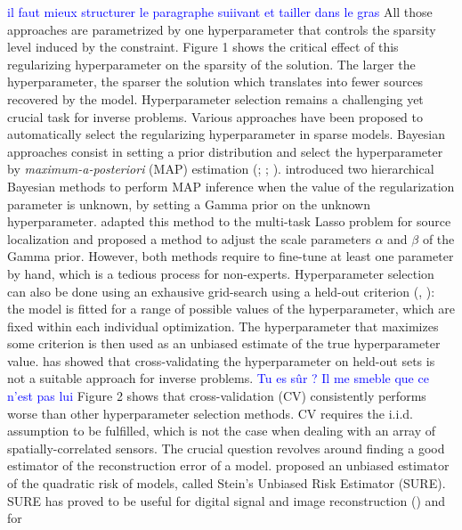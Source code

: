 \textcolor{blue}{il faut mieux structurer le paragraphe suiivant et tailler dans le gras}
All those approaches are parametrized by one hyperparameter that controls the sparsity level
induced by the constraint. Figure 1 shows the critical effect of this regularizing hyperparameter
on the sparsity of the solution. The larger the hyperparameter, the sparser the solution which translates
into fewer sources recovered by the model. Hyperparameter selection remains a challenging yet crucial task
for inverse problems. Various approaches have been proposed to automatically select the regularizing
hyperparameter in sparse models. Bayesian approaches consist in setting a prior distribution
and select the hyperparameter by \textit{maximum-a-posteriori} (MAP) estimation (\cite{Pereyra_BioucasDias_Figueiredo_2015};
\cite{Vidal_Bortoli_Pereyra_Durmus_2020}; \cite{Hashemi_Cai_Kutyniok_Muller_2020}).
\cite{Pereyra_BioucasDias_Figueiredo_2015} introduced two hierarchical Bayesian methods to perform MAP
inference when the value of the regularization parameter is unknown, by setting a Gamma prior on the
unknown hyperparameter. \cite{Bekhti_Badeau_Gramfort_2017} adapted this method to the multi-task Lasso problem
for source localization and proposed a method to adjust the scale parameters $\alpha$ and $\beta$
of the Gamma prior. However, both methods require to fine-tune at least one parameter by hand, which is a
tedious process for non-experts. Hyperparameter selection can also be done using an exhausive
grid-search using a held-out criterion (\cite{Bergstra_Bengio12}, \cite{BergstraBardenetBengioKegl2011}):
the model is fitted for a range of possible values of the hyperparameter, which are fixed within each individual optimization.
The hyperparameter that maximizes some criterion is then used as an unbiased estimate of the true hyperparameter value.
\cite{Pedregosa16} has showed that cross-validating the hyperparameter on held-out sets is not a suitable approach for inverse
problems.
\textcolor{blue}{Tu es sûr ? Il me smeble que ce n'est pas lui}
Figure 2 shows that cross-validation (CV) consistently performs worse than other
hyperparameter selection methods. CV requires the i.i.d. assumption to be fulfilled, which is
not the case when dealing with an array of spatially-correlated sensors. The crucial question revolves around
finding a good estimator of the reconstruction error of a model. \cite{Stein81} proposed an unbiased estimator
of the quadratic risk of models, called Stein's Unbiased Risk Estimator (SURE). SURE has proved to be
useful for digital signal and image reconstruction (\cite{Pesquet_Benazza_Chaux_2009}) and for
